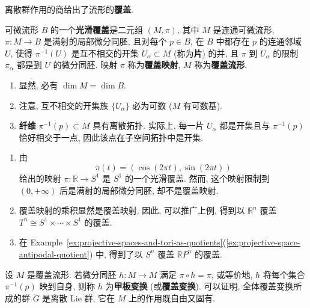 离散群作用的商给出了流形的\textbf{覆盖}.

\begin{RiemannDefinition}\label{def:smooth-covering-of-manifold}
可微流形 $B$ 的一个\textbf{光滑覆盖}是二元组 $(M,\pi)$, 其中 $M$ 是连通可微流形, $\pi:M\to B$ 是满射的局部微分同胚, 且对每个 $p\in B$, 在 $B$ 中都存在 $p$ 的连通邻域 $U$, 使得 $\pi^{-1}(U)$ 是互不相交的开集 $U_\alpha\subset M$ (称为\textbf{片}) 的并, 且 $\pi$ 到 $U_\alpha$ 的限制 $\pi_\alpha$ 都是到 $U$ 的微分同胚. 映射 $\pi$ 称为\textbf{覆盖映射}, $M$ 称为\textbf{覆盖流形}.
\end{RiemannDefinition}

\begin{RiemannRemark}\label{rem:dimensions-and-fibers-of-coverings}
\begin{enumerate}[label=(\arabic*),leftmargin=*]
\item 显然, 必有 $\dim M=\dim B$.
\item 注意, 互不相交的开集族 $\{U_\alpha\}$ 必为可数 ($M$ 有可数基).
\item \textbf{纤维} $\pi^{-1}(p)\subset M$ 具有离散拓扑. 实际上, 每一片 $U_\alpha$ 都是开集且与 $\pi^{-1}(p)$ 恰好相交于一点, 因此该点在子空间拓扑中是开集.
\end{enumerate}
\end{RiemannRemark}

\begin{RiemannExample}\label{ex:coverings-of-circle-torus-projective-space}
\begin{enumerate}[label=(\arabic*),ref=\arabic*,leftmargin=*]
\item\label{ex:real-line-covers-circle} 由
\[
  \pi(t)=(\cos(2\pi t),\sin(2\pi t))
\]
给出的映射 $\pi:\mathbb{R}\to S^1$ 是 $S^1$ 的一个光滑覆盖. 然而, 这个映射限制到 $(0,+\infty)$ 后是满射的局部微分同胚, 却不是覆盖映射.
\item\label{ex:euclidean-space-covers-torus} 覆盖映射的乘积显然是覆盖映射. 因此, 可以推广上例, 得到以 $\mathbb{R}^n$ 覆盖 $T^n\cong S^1\times\cdots\times S^1$ 的覆盖.
\item\label{ex:sphere-covers-projective-space} 在 Example~\ref{ex:projective-spaces-and-tori-as-quotients}(\ref{ex:projective-space-antipodal-quotient}) 中, 得到了以 $S^n$ 覆盖 $\mathbb{R}P^n$ 的覆盖.
\end{enumerate}
\end{RiemannExample}

设 $M$ 是覆盖流形. 若微分同胚 $h:M\to M$ 满足 $\pi\circ h=\pi$, 或等价地, $h$ 将每个集合 $\pi^{-1}(p)$ 映到自身, 则称 $h$ 为\textbf{甲板变换} (或\textbf{覆盖变换}). 可以证明, 全体覆盖变换所成的群 $G$ 是离散 Lie 群, 它在 $M$ 上的作用既自由又固有.

